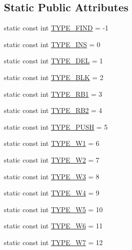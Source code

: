 \subsection*{Static Public Attributes}
\begin{DoxyCompactItemize}
\item 
static const int \hyperlink{classbst__ns_1_1SCXRecord_a06dcb8bed28b088f6dbf7cd15991dfd1}{T\+Y\+P\+E\+\_\+\+F\+I\+ND} = -\/1
\item 
static const int \hyperlink{classbst__ns_1_1SCXRecord_afc069eba9ed16a5ffdbc9f5a3e33eb8c}{T\+Y\+P\+E\+\_\+\+I\+NS} = 0
\item 
static const int \hyperlink{classbst__ns_1_1SCXRecord_afbd455b4d9c688123649bd661056bf3f}{T\+Y\+P\+E\+\_\+\+D\+EL} = 1
\item 
static const int \hyperlink{classbst__ns_1_1SCXRecord_a185f400e57364087d1656d9bbba4fd9f}{T\+Y\+P\+E\+\_\+\+B\+LK} = 2
\item 
static const int \hyperlink{classbst__ns_1_1SCXRecord_a9f2946ea296a3289d770646458eecfa2}{T\+Y\+P\+E\+\_\+\+R\+B1} = 3
\item 
static const int \hyperlink{classbst__ns_1_1SCXRecord_a7d90066fb5fa026bc88a01cc2675059b}{T\+Y\+P\+E\+\_\+\+R\+B2} = 4
\item 
static const int \hyperlink{classbst__ns_1_1SCXRecord_ace5436c6cbba73c8c17529f7f605c0b2}{T\+Y\+P\+E\+\_\+\+P\+U\+SH} = 5
\item 
static const int \hyperlink{classbst__ns_1_1SCXRecord_a2ec4ce153055e8e0577e08ee9020e1f9}{T\+Y\+P\+E\+\_\+\+W1} = 6
\item 
static const int \hyperlink{classbst__ns_1_1SCXRecord_a9a88e3ff30eabbebc01d1480cc6dbdf6}{T\+Y\+P\+E\+\_\+\+W2} = 7
\item 
static const int \hyperlink{classbst__ns_1_1SCXRecord_a0a88774d83c15e2dc231df16d4cd907b}{T\+Y\+P\+E\+\_\+\+W3} = 8
\item 
static const int \hyperlink{classbst__ns_1_1SCXRecord_ab928d1cabbcaa459855b883e3438fc92}{T\+Y\+P\+E\+\_\+\+W4} = 9
\item 
static const int \hyperlink{classbst__ns_1_1SCXRecord_afc98c244e075bd350fcbdbe6c01e94bf}{T\+Y\+P\+E\+\_\+\+W5} = 10
\item 
static const int \hyperlink{classbst__ns_1_1SCXRecord_af57222b8f4c33530d611c619b103c1d7}{T\+Y\+P\+E\+\_\+\+W6} = 11
\item 
static const int \hyperlink{classbst__ns_1_1SCXRecord_ab0d4f9a6d76b1be804061d809673e41a}{T\+Y\+P\+E\+\_\+\+W7} = 12
\item 

\end{DoxyCompactItemize}
